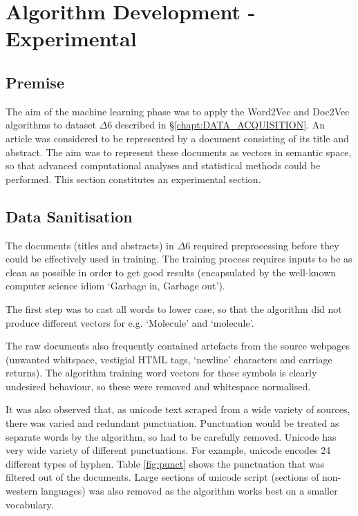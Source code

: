 \chapter{Algorithm Development - Experimental}
\label{chapt:ALGORITHM}
\section{Premise}
The aim of the machine learning phase was to apply the Word2Vec and Doc2Vec algorithms to dataset $\Delta6$ described in \S\ref{chapt:DATA_ACQUISITION}. An article was considered to be represented by a document consisting of its title and abstract. The aim was to represent these documents as vectors in semantic space, so that advanced computational analyses and statistical methods could be performed. This section constitutes an experimental section.
\section{Data Sanitisation} 
The documents (titles and abstracts) in $\Delta6$ required preprocessing before they could be effectively used in training. The training process requires inputs to be as clean as possible in order to get good results (encapsulated by the well-known computer science idiom `Garbage in, Garbage out'). 

The first step was to cast all words to lower case, so that the algorithm did not produce different vectors for e.g.  `Molecule' and `molecule'.

The raw documents also frequently contained artefacts from the source webpages (unwanted whitspace, vestigial HTML tags, `newline' characters and carriage returns). The algorithm training word vectors for these symbols is clearly undesired behaviour, so these were removed and whitespace normalised.

It was also observed that, as unicode text scraped from a wide variety of sources, there was varied and redundant punctuation. Punctuation would be treated as separate words by the algorithm, so had to be carefully removed. Unicode has very wide variety of different punctuations. For example, unicode encodes 24 different types of hyphen. Table \ref{fig:punct} shows the punctuation that was filtered out of the documents. Large sections of unicode script (sections of non-western languages) was also removed as the algorithm works best on a smaller vocabulary.

